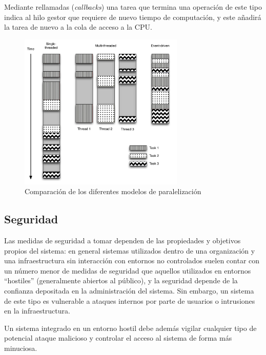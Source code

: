 
Mediante rellamadas (\textit{callbacks}) una tarea que termina una operación de este tipo indica al hilo gestor que requiere de nuevo tiempo de computación, y este añadirá la tarea de nuevo a la cola de acceso a la CPU.

\begin{figure}[H]
  \centering
  \includegraphics[width=0.7\textwidth]{Chapter2/Figures/threadcomparison}
  \caption[Modelos de paralelización]{Comparación de los diferentes modelos de paralelización\cite{Fettig:2005:TNP:1205685}}
  \label{fig:threadcomparison}
\end{figure}

\subsection{Seguridad}

Las medidas de seguridad a tomar dependen de las propiedades y objetivos propios del sistema: en general sistemas utilizados dentro de una organización y una infraestructura sin interacción con entornos no controlados suelen contar con un número menor de medidas de seguridad que aquellos utilizados en entornos ``hostiles'' (generalmente abiertos al público), y la seguridad depende de la confianza depositada en la administración del sistema. Sin embargo, un sistema de este tipo es vulnerable a ataques internos por parte de usuarios o intrusiones en la infraestructura.

Un sistema integrado en un entorno hostil debe además vigilar cualquier tipo de potencial ataque malicioso y controlar el acceso al sistema de forma más minuciosa.

